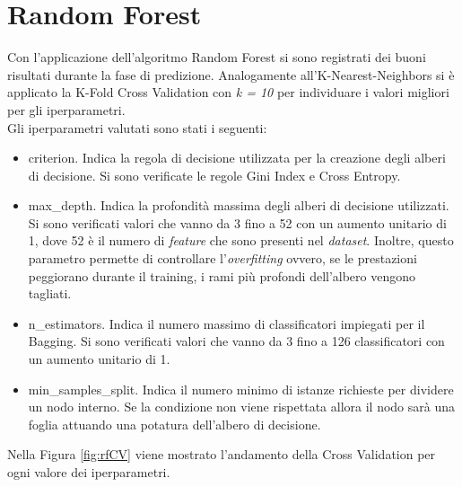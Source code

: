 \section{Random Forest}
Con l'applicazione dell'algoritmo Random Forest si sono registrati dei buoni risultati durante la fase di predizione. Analogamente all'K-Nearest-Neighbors si è applicato la K-Fold Cross Validation con \emph{k = 10} per individuare i valori migliori per gli iperparametri.\\
Gli iperparametri valutati sono stati i seguenti:
\begin{itemize}
	\item \textsf{criterion}. Indica la regola di decisione utilizzata per la creazione degli alberi di decisione. Si sono verificate le regole Gini Index e Cross Entropy.
	\item \textsf{max\_depth}. Indica la profondità massima degli alberi di decisione utilizzati. Si sono verificati valori che vanno da 3 fino a 52 con un aumento unitario di 1, dove 52 è il numero di \emph{feature} che sono presenti nel \emph{dataset}. Inoltre, questo parametro permette di controllare l'\emph{overfitting} ovvero, se le prestazioni peggiorano durante il training, i rami più profondi dell'albero vengono tagliati.
	\item \textsf{n\_estimators}. Indica il numero massimo di classificatori impiegati per il Bagging. Si sono verificati valori che vanno da 3 fino a 126 classificatori con un aumento unitario di 1.
	\item \textsf{min\_samples\_split}. Indica il numero minimo di istanze richieste per dividere un nodo interno. Se la condizione non viene rispettata allora il nodo sarà una foglia attuando una potatura dell'albero di decisione.
\end{itemize}
Nella Figura \ref{fig:rfCV} viene mostrato l'andamento della Cross Validation per ogni valore dei iperparametri.\\




